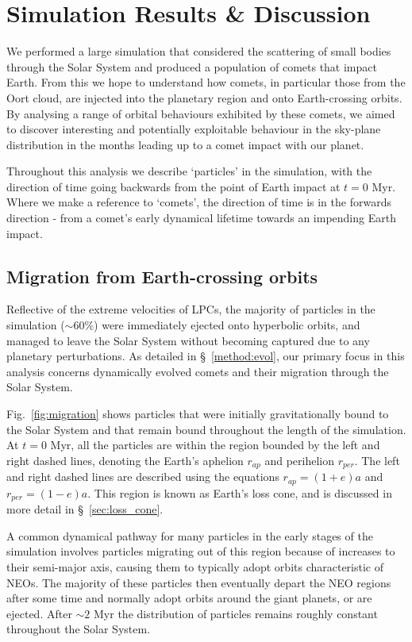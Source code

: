 \chapter{Simulation Results \& Discussion}
\label{chap:results}

We performed a large simulation that considered the scattering of small bodies through the Solar System and produced a population of comets that impact Earth. From this we hope to understand how comets, in particular those from the Oort cloud, are injected into the planetary region and onto Earth-crossing orbits. By analysing a range of orbital behaviours exhibited by these comets, we aimed to discover interesting and potentially exploitable behaviour in the sky-plane distribution in the months leading up to a comet impact with our planet.

Throughout this analysis we describe `particles' in the simulation, with the direction of time going backwards from the point of Earth impact at $t=0$ Myr. Where we make a reference to `comets', the direction of time is in the forwards direction - from a comet's early dynamical lifetime towards an impending Earth impact.

\section{Migration from Earth-crossing orbits}
\label{sec:migration}

Reflective of the extreme velocities of LPCs, the majority of particles in the simulation ($\sim60$\%) were immediately ejected onto hyperbolic orbits, and managed to leave the Solar System without becoming captured due to any planetary perturbations. As detailed in \S~\ref{method:evol}, our primary focus in this analysis concerns dynamically evolved comets and their migration through the Solar System.

Fig.~\ref{fig:migration} shows particles that were initially gravitationally bound to the Solar System and that remain bound throughout the length of the simulation. At $t=0$ Myr, all the particles are within the region bounded by the left and right dashed lines, denoting the Earth's aphelion $r_{ap}$ and perihelion $r_{per}$. The left and right dashed lines are described using the equations $r_{ap} = (1+e)a$ and $r_{per} = (1-e)a$. This region is known as Earth's loss cone, and is discussed in more detail in \S~\ref{sec:loss_cone}. 

A common dynamical pathway for many particles in the early stages of the simulation involves particles migrating out of this region because of increases to their semi-major axis, causing them to typically adopt orbits characteristic of NEOs. The majority of these particles then eventually depart the NEO regions after some time and normally adopt orbits around the giant planets, or are ejected. After $\sim2$ Myr the distribution of particles remains roughly constant throughout the Solar System.

